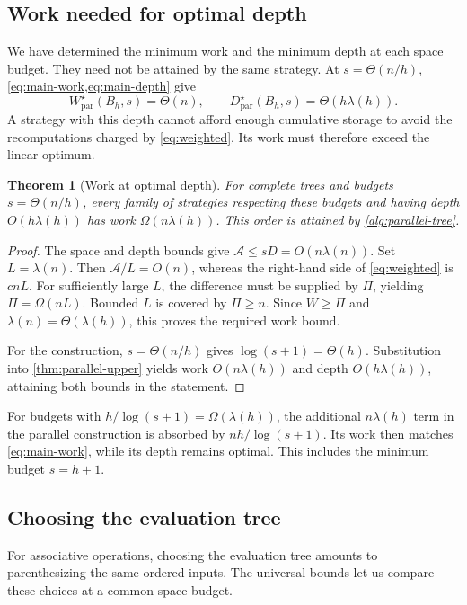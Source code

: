 \documentclass[11pt]{article}
\newtheorem{theorem}{Theorem}[section]
\theoremstyle{definition}
\theoremstyle{remark}
\newcommand{\Area}{\mathcal A}
\newcommand{\Wpar}{W_{\mathrm{par}}}
\newcommand{\Dpar}{D_{\mathrm{par}}}
\begin{document}
\subsection{Work needed for optimal depth}
\label{sec:separation}

We have determined the minimum work and the minimum depth at each space budget. They need not be attained by the same strategy. At $s=\Theta(n/h)$, \cref{eq:main-work,eq:main-depth} give
\[
\Wpar^\star(B_h,s)=\Theta(n), \qquad \Dpar^\star(B_h,s)=\Theta(h\lambda(h)).
\]
A strategy with this depth cannot afford enough cumulative storage to avoid the recomputations charged by \cref{eq:weighted}. Its work must therefore exceed the linear optimum.

\begin{theorem}[Work at optimal depth]
\label{thm:separation}
For complete trees and budgets $s=\Theta(n/h)$, every family of strategies respecting these budgets and having depth $O(h\lambda(h))$ has work $\Omega(n\lambda(h))$. This order is attained by \cref{alg:parallel-tree}.
\end{theorem}
\begin{proof}
The space and depth bounds give $\Area\le sD=O(n\lambda(n))$. Set $L=\lambda(n)$. Then $\Area/L=O(n)$, whereas the right-hand side of \cref{eq:weighted} is $cnL$. For sufficiently large $L$, the difference must be supplied by $\Pi$, yielding $\Pi=\Omega(nL)$. Bounded $L$ is covered by $\Pi\ge n$. Since $W\ge\Pi$ and $\lambda(n)=\Theta(\lambda(h))$, this proves the required work bound.

For the construction, $s=\Theta(n/h)$ gives $\log(s+1)=\Theta(h)$. Substitution into \cref{thm:parallel-upper} yields work $O(n\lambda(h))$ and depth $O(h\lambda(h))$, attaining both bounds in the statement.
\end{proof}

For budgets with $h/\log(s+1)=\Omega(\lambda(h))$, the additional $n\lambda(h)$ term in the parallel construction is absorbed by $nh/\log(s+1)$. Its work then matches \cref{eq:main-work}, while its depth remains optimal. This includes the minimum budget $s=h+1$.

\subsection{Choosing the evaluation tree}
\label{sec:tree-shape}

For associative operations, choosing the evaluation tree amounts to parenthesizing the same ordered inputs. The universal bounds let us compare these choices at a common space budget.
\end{document}
